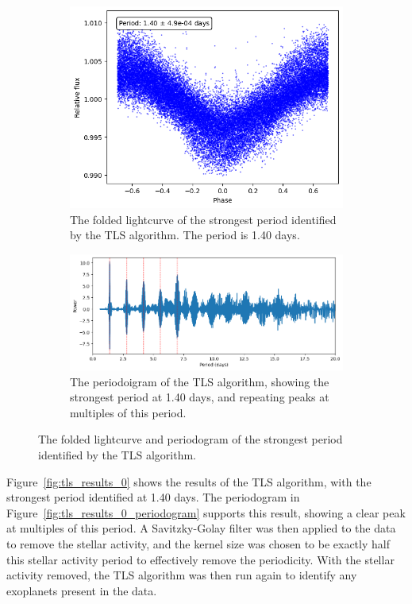 \begin{figure}
\centering
\begin{subfigure}{0.5\textwidth}
    \centering
    \includegraphics[width=1\textwidth]{figures/tls_results_0}
    \caption{The folded lightcurve of the strongest period identified by the TLS algorithm. The period is 1.40 days.}
    \label{fig:tls_results_0_folded}
\end{subfigure}%
\hfill
\begin{subfigure}{0.75\textwidth}
    \centering
    \includegraphics[width=1\textwidth]{./figures/tls_results_0_periodogram}
    \caption{The periodoigram of the TLS algorithm, showing the strongest period at 1.40 days, and repeating
    peaks at multiples of this period.}
    \label{fig:tls_results_0_periodogram}
\end{subfigure}
\caption{The folded lightcurve and periodogram of the strongest period identified by the TLS algorithm.}
\label{fig:tls_results_0}
\end{figure}

Figure~\eqref{fig:tls_results_0} shows the results of the TLS algorithm, with the strongest period identified at 1.40 days.
The periodogram in Figure~\eqref{fig:tls_results_0_periodogram} supports this result, showing a clear peak at multiples of this period.
A Savitzky-Golay filter was then applied to the data to remove the stellar activity, and the kernel size was chosen to be exactly
half this stellar activity period to effectively remove the periodicity.
With the stellar activity removed, the TLS algorithm was then run again to identify any exoplanets present in the data.

